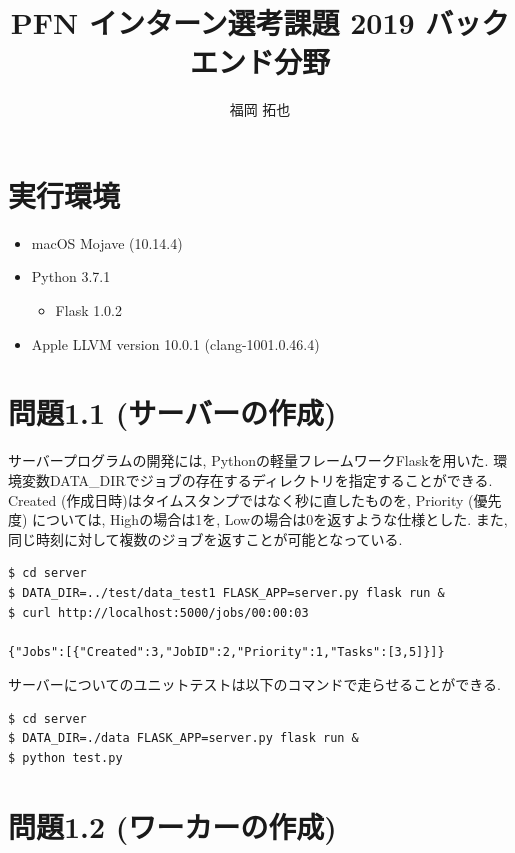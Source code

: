 


\title{PFN インターン選考課題 2019 バックエンド分野}
\author{福岡 拓也}
\date{}
\maketitle

\small


\section*{実行環境}
\begin{itemize}
    \item macOS Mojave (10.14.4)
    \item Python 3.7.1
        \begin{itemize}
            \item Flask 1.0.2
        \end{itemize}
    \item Apple LLVM version 10.0.1 (clang-1001.0.46.4)
\end{itemize}

\section*{問題1.1 (サーバーの作成)}
サーバープログラムの開発には, Pythonの軽量フレームワークFlaskを用いた. 
環境変数DATA\_DIRでジョブの存在するディレクトリを指定することができる. 
Created (作成日時)はタイムスタンプではなく秒に直したものを, 
Priority (優先度) については, Highの場合は1を, Lowの場合は0を返すような仕様とした. 
また, 同じ時刻に対して複数のジョブを返すことが可能となっている. 

\begin{lstlisting}[]
$ cd server
$ DATA_DIR=../test/data_test1 FLASK_APP=server.py flask run &
$ curl http://localhost:5000/jobs/00:00:03

{"Jobs":[{"Created":3,"JobID":2,"Priority":1,"Tasks":[3,5]}]}
\end{lstlisting}

サーバーについてのユニットテストは以下のコマンドで走らせることができる.

\begin{lstlisting}[]
$ cd server
$ DATA_DIR=./data FLASK_APP=server.py flask run &
$ python test.py
\end{lstlisting}

\section*{問題1.2 (ワーカーの作成)}

